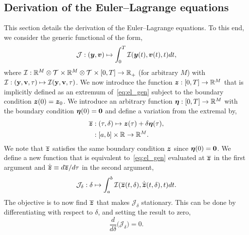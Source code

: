 \documentclass[3p,computermodern,10pt]{elsarticle}
\begin{document}
\begin{appendices}
\section{Derivation of the Euler--Lagrange equations}\label{appendix:eulerlagrange}
This section details the derivation of the Euler--Lagrange equations. To this end, we consider the generic functional of the form,
\begin{equation}\label{eq:el_gen}
\mathcal{J}: (\boldsymbol y,{\boldsymbol v}) \mapsto  \int_0^T \mathcal{I}(\boldsymbol y(t),{\boldsymbol v}(t),t)  dt,
\end{equation}
where $\mathcal{I}: \mathbb{R}^{M} \otimes \mathcal{T}^{} \times \mathbb{R}^{M} \otimes \mathcal{T}^{} \times[0,T] \rightarrow  \mathbb{R}^{}_{+}$ (for arbitrary $M$) with $\mathcal{I}: (\mathbf{y},\mathbf{{v}},\tau) \mapsto \mathcal{I}(\mathbf{y},\mathbf{{v}},\tau)$. We now introduce the function $\boldsymbol z: [0,T] \rightarrow \mathbb{R}^{M}$ that is implicitly defined as an extremum of~\eqref{eq:el_gen} subject to the boundary condition $\boldsymbol z(0) = \boldsymbol z_0$. 
We introduce an arbitrary function $\boldsymbol \eta : [0,T] \rightarrow \mathbb{R}^{M}$ with the boundary condition $\boldsymbol \eta(0) = \boldsymbol 0$ and define a variation from the extremal by,
\begin{align*}
\overline{\boldsymbol z}  &: (\tau,\delta) \mapsto \boldsymbol z(\tau) + \delta \boldsymbol \eta(\tau),\\
&: [a,b] \times \mathbb{R}^{} \rightarrow \mathbb{R}^{M}.
\end{align*}
We note that $\overline{\boldsymbol z}$ satisfies the same boundary condition $\boldsymbol z$ since $\boldsymbol \eta(0) = \boldsymbol 0$.
We define a new function that is equivalent to~\eqref{eq:el_gen} evaluated at $\overline{\boldsymbol z}$ in the first argument and 
$\dot{\overline{\boldsymbol z}} \equiv d\overline{\boldsymbol z} / d\tau$ in the second argument,
$$
\mathcal{J}_{\delta}: \delta \mapsto \int_a^b \mathcal{I}(\overline{\boldsymbol z}(t,\delta),\dot{\overline{\boldsymbol z}}(t,\delta) ,t)  dt.
$$
The objective is to now find $\overline{\boldsymbol z}$ that makes $\mathcal{J}_{\delta}$ stationary. This can be done by differentiating with respect to $\delta$, and setting the result to zero,%
$$
\frac{d}{d\delta} \big( \mathcal{J}_{\delta} \big)=  0.
$$

\end{appendices}
\end{document}

